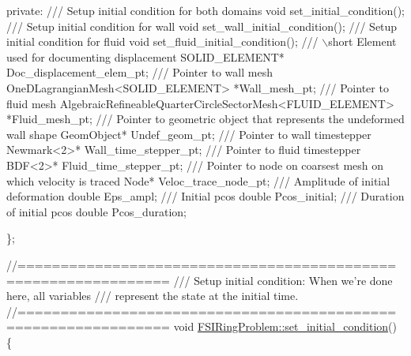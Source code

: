 \begin{DoxyCodeInclude}
\textcolor{keyword}{private}:
\textcolor{comment}{}
\textcolor{comment}{ /// Setup initial condition for both domains}
\textcolor{comment}{} \textcolor{keywordtype}{void} set\_initial\_condition();
\textcolor{comment}{}
\textcolor{comment}{ /// Setup initial condition for wall}
\textcolor{comment}{} \textcolor{keywordtype}{void} set\_wall\_initial\_condition();
\textcolor{comment}{}
\textcolor{comment}{ /// Setup initial condition for fluid}
\textcolor{comment}{} \textcolor{keywordtype}{void} set\_fluid\_initial\_condition();
\textcolor{comment}{}
\textcolor{comment}{ /// \(\backslash\)short Element used for documenting displacement}
\textcolor{comment}{} SOLID\_ELEMENT* Doc\_displacement\_elem\_pt;
\textcolor{comment}{}
\textcolor{comment}{ /// Pointer to wall mesh}
\textcolor{comment}{} OneDLagrangianMesh<SOLID\_ELEMENT> *Wall\_mesh\_pt;
\textcolor{comment}{}
\textcolor{comment}{ /// Pointer to fluid mesh}
\textcolor{comment}{} AlgebraicRefineableQuarterCircleSectorMesh<FLUID\_ELEMENT> *Fluid\_mesh\_pt;
\textcolor{comment}{}
\textcolor{comment}{ /// Pointer to geometric object that represents the undeformed wall shape}
\textcolor{comment}{} GeomObject* Undef\_geom\_pt;
\textcolor{comment}{}
\textcolor{comment}{ /// Pointer to wall timestepper}
\textcolor{comment}{} Newmark<2>* Wall\_time\_stepper\_pt;
\textcolor{comment}{}
\textcolor{comment}{ /// Pointer to fluid timestepper}
\textcolor{comment}{} BDF<2>* Fluid\_time\_stepper\_pt;
\textcolor{comment}{}
\textcolor{comment}{ /// Pointer to node on coarsest mesh on which velocity is traced}
\textcolor{comment}{} Node* Veloc\_trace\_node\_pt;
\textcolor{comment}{}
\textcolor{comment}{ /// Amplitude of initial deformation}
\textcolor{comment}{} \textcolor{keywordtype}{double} Eps\_ampl;
\textcolor{comment}{}
\textcolor{comment}{ /// Initial pcos }
\textcolor{comment}{} \textcolor{keywordtype}{double} Pcos\_initial;
\textcolor{comment}{}
\textcolor{comment}{ /// Duration of initial pcos}
\textcolor{comment}{} \textcolor{keywordtype}{double} Pcos\_duration;

\};


\textcolor{comment}{//===============================================================}\textcolor{comment}{}
\textcolor{comment}{/// Setup initial condition: When we're done here, all variables}
\textcolor{comment}{/// represent the state at the initial time.}
\textcolor{comment}{}\textcolor{comment}{//===============================================================}
\textcolor{keywordtype}{void} \hyperlink{classFSIRingProblem_a309ea4c79fbae58020d94bf2c2318169}{FSIRingProblem::set\_initial\_condition}()
\{ 


\end{DoxyCodeInclude}
